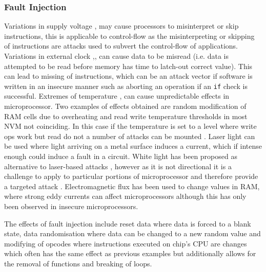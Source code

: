\subsubsection{Fault Injection}

Variations in supply voltage \cite{Anderson1996},\cite{Blomer2010} may cause processors to misinterpret or skip instructions, this is applicable to control-flow as the misinterpreting or skipping of instructions are attacks used to subvert the control-flow of applications.
Variations in external clock \cite{Anderson1996},\cite{Street},\cite{Kommerling1999} can cause data to be misread (i.e. data is attempted to be read before memory has time to latch-out correct value). This can lead to missing of instructions, which can be an attack vector if software is written in an insecure manner such as aborting an operation if an \verb|if| check is successful.
Extremes of temperature \cite{Boneh},\cite{Govindavajhala2003} can cause unpredictable effects in microprocessor. Two examples of effects obtained \cite{Bar-el2006} are random modification of RAM cells due to overheating and read write temperature thresholds in most NVM  not coinciding. In this case if the temperature is set to a level where write ops work but read do not a number of attacks can be mounted . Laser light \cite{Habing1965} can be used where light arriving on a metal surface induces a current, which if intense enough could induce a fault in a circuit. White light \cite{Anderson1996} has been proposed as alternative to laser-based attacks  \cite{Skorobogatov2007}, however as it is not directional it is a challenge to apply to particular portions of microprocessor and therefore provide a targeted attack . Electromagnetic flux \cite{Samyde2003} has been used to change values in RAM, where strong eddy currents can affect microprocessors although this has only been observed in insecure microprocessors.

The effects of fault injection include reset data where data is forced to a blank state, data randomisation where data can be changed to a new random value and modifying of opcodes where instructions executed on chip's CPU are changes\cite{Anderson1996} which often has the same effect as previous examples but additionally allows for the removal of functions and breaking of loops. 

  
